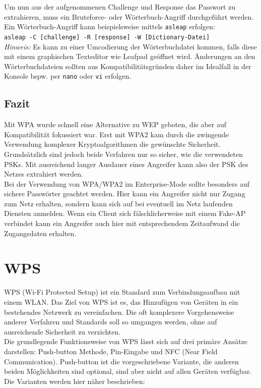\begin{enumerate}
	Um nun aus der aufgenommenen Challenge und Response das Passwort zu extrahieren, muss ein Bruteforce- oder Wörterbuch-Angriff durchgeführt werden. \\
	Ein Wörterbuch-Angriff kann beispielsweise mittels \colorbox{altgray}{\lstinline|asleap|} erfolgen: \\
	\colorbox{altgray}{\lstinline|asleap -C [challenge] -R [response] -W [Dictionary-Datei]|}\\
	\textit{Hinweis:} Es kann zu einer Umcodierung der Wörterbuchdatei kommen, falls diese mit einem graphischen Texteditor wie Leafpad geöffnet wird. Änderungen an den Wörterbuchdateien sollten aus Kompatibilitätsgründen daher im Idealfall in der Konsole bspw. per \colorbox{altgray}{\lstinline|nano|} oder \colorbox{altgray}{\lstinline|vi|}  erfolgen.
\end{enumerate}


\subsection{Fazit}
Mit WPA wurde schnell eine Alternative zu WEP geboten, die aber auf Kompatibilität fokussiert war. Erst mit WPA2 kam durch die zwingende Verwendung komplexer Kryptoalgorithmen die gewünschte Sicherheit. \\
Grundsätzlich sind jedoch beide Verfahren nur so sicher, wie die verwendeten PSKs. Mit ausreichend langer Ausdauer eines Angreifer kann also der PSK des Netzes extrahiert werden. \\
Bei der Verwendung von WPA/WPA2 im Enterprise-Mode sollte besonders auf sichere Passwörter geachtet werden. Hier kann ein Angreifer nicht nur Zugang zum Netz erhalten, sondern kann sich auf bei eventuell im Netz laufenden Diensten anmelden. Wenn ein Client sich fälschlicherweise mit einem Fake-AP verbindet kann ein Angreifer auch hier mit entsprechendem Zeitaufwand die Zugangsdaten erhalten.
\newpage

\section{WPS}

WPS (Wi-Fi Protected Setup) ist ein Standard zum Verbindungsaufbau mit einem WLAN. Das Ziel von WPS ist es, das Hinzufügen von Geräten in ein bestehendes Netzwerk zu vereinfachen. Die oft komplexere Vorgehensweise anderer Verfahren und Standards soll so umgangen werden, ohne auf ausreichende Sicherheit zu verzichten. \\
Die grundlegende Funktionsweise von WPS lässt sich auf drei primäre Ansätze darstellen: Push-button Methode, Pin-Eingabe und NFC (Near Field Communication). Push-button ist die vorgeschriebene Variante, die anderen beiden Möglichkeiten sind optional, sind aber nicht auf allen Geräten verfügbar. \\
Die Varianten werden hier näher beschrieben:

